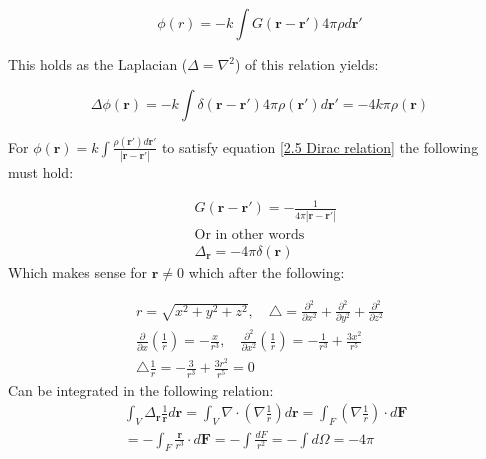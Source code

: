 \begin{equation}
    \phi(r) = -k \int G(\textbf{r}-\textbf{r}')4\pi \rho d \textbf{r}'
    \label{2.5 Dirac relation}
\end{equation}

\noindent This holds as the Laplacian ($\Delta = \nabla^2$) of this relation yields:

\begin{equation}
    \Delta \phi(\textbf{r}) = -k\int \delta(\textbf{r}-\textbf{r}') 4\pi \rho(\textbf{r}') d\textbf{r}' = -4k\pi\rho(\textbf{r})
\end{equation}

\noindent For $\displaystyle \phi(\textbf{r}) = k \int \frac{\rho(\textbf{r}')d\textbf{r}'}{|\textbf{r}-\textbf{r}'|}$ to satisfy equation \ref{2.5 Dirac relation} the following must hold:

\begin{equation}
    \begin{aligned}
    &G(\textbf{r}-\textbf{r}') = -\frac{1}{4\pi |\textbf{r}-\textbf{r}'|}\\
    &\text{Or in other words}\\
    &\Delta_{\textbf{r}} = -4\pi \delta(\textbf{r})
    \end{aligned}
    \label{2.5poisson}
\end{equation}
Which makes sense for $\textbf{r} \neq 0$ which after the following:

\begin{equation}
\begin{array}{c}
    \displaystyle
r=\sqrt{x^{2}+y^{2}+z^{2}}, \quad \triangle=\frac{\partial^{2}}{\partial x^{2}}+\frac{\partial^{2}}{\partial y^{2}}+\frac{\partial^{2}}{\partial z^{2}} \\

\frac{\partial}{\partial x}\left(\frac{1}{r}\right)=-\frac{x}{r^{3}}, \quad \frac{\partial^{2}}{\partial x^{2}}\left(\frac{1}{r}\right)=-\frac{1}{r^{3}}+\frac{3 x^{2}}{r^{5}}\\

\triangle \frac{1}{r}=-\frac{3}{r^{3}}+\frac{3 r^{2}}{r^{5}}=0
\end{array}
\end{equation}
Can be integrated in the following relation:
\begin{equation}
    \begin{aligned}
    &\int_V \Delta_\textbf{r} \frac{1}{\textbf{r}}d \textbf{r} = \int_V \nabla \cdot (\nabla\frac{1}{r})d\textbf{r} = \int_F (\nabla \frac{1}{r}) \cdot d\textbf{F}\\
   & = -\int_F \frac{\textbf{r}}{r^3}\cdot d \textbf{F} = -\int \frac{dF}{r^2}= -\int d\Omega = -4\pi\\
   \end{aligned} 
\end{equation}

